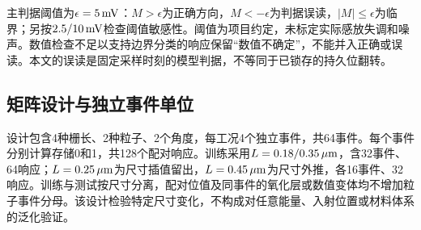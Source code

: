 主判据阈值为$\epsilon=5\,\mathrm{mV}$：$M>\epsilon$为正确方向，$M<-\epsilon$为判据误读，$|M|\leq\epsilon$为临界；另按$2.5/10\,\mathrm{mV}$检查阈值敏感性。阈值为项目约定，未标定实际感放失调和噪声。数值检查不足以支持边界分类的响应保留“数值不确定”，不能并入正确或误读。本文的误读是固定采样时刻的模型判据，不等同于已锁存的持久位翻转。

\subsection{矩阵设计与独立事件单位}
设计包含4种栅长、2种粒子、2个角度，每工况4个独立事件，共64事件。每个事件分别计算存储0和1，共128个配对响应。训练采用$L=0.18/0.35\,\mu\mathrm{m}$，含32事件、64响应；$L=0.25\,\mu\mathrm{m}$为尺寸插值留出，$L=0.45\,\mu\mathrm{m}$为尺寸外推，各16事件、32响应。训练与测试按尺寸分离，配对位值及同事件的氧化层或数值变体均不增加粒子事件分母。该设计检验特定尺寸变化，不构成对任意能量、入射位置或材料体系的泛化验证。
